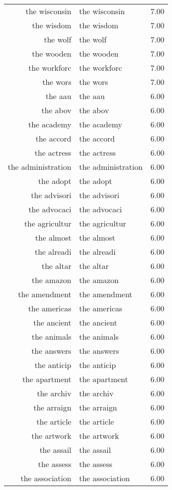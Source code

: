 \begin{table}[ht]
\begin{tabular}{rlr}
  the wisconsin & the wisconsin & 7.00 \\ 
  the wisdom & the wisdom & 7.00 \\ 
  the wolf & the wolf & 7.00 \\ 
  the wooden & the wooden & 7.00 \\ 
  the workforc & the workforc & 7.00 \\ 
  the wors & the wors & 7.00 \\ 
  the aau & the aau & 6.00 \\ 
  the abov & the abov & 6.00 \\ 
  the academy & the academy & 6.00 \\ 
  the accord & the accord & 6.00 \\ 
  the actress & the actress & 6.00 \\ 
  the administration & the administration & 6.00 \\ 
  the adopt & the adopt & 6.00 \\ 
  the advisori & the advisori & 6.00 \\ 
  the advocaci & the advocaci & 6.00 \\ 
  the agricultur & the agricultur & 6.00 \\ 
  the almost & the almost & 6.00 \\ 
  the alreadi & the alreadi & 6.00 \\ 
  the altar & the altar & 6.00 \\ 
  the amazon & the amazon & 6.00 \\ 
  the amendment & the amendment & 6.00 \\ 
  the americas & the americas & 6.00 \\ 
  the ancient & the ancient & 6.00 \\ 
  the animals & the animals & 6.00 \\ 
  the answers & the answers & 6.00 \\ 
  the anticip & the anticip & 6.00 \\ 
  the apartment & the apartment & 6.00 \\ 
  the archiv & the archiv & 6.00 \\ 
  the arraign & the arraign & 6.00 \\ 
  the article & the article & 6.00 \\ 
  the artwork & the artwork & 6.00 \\ 
  the assail & the assail & 6.00 \\ 
  the assess & the assess & 6.00 \\ 
  the association & the association & 6.00 \\ 

\end{tabular}
\end{table}
